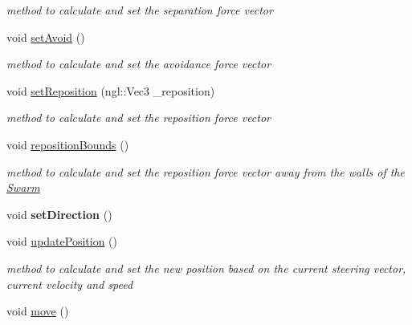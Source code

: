 \begin{DoxyCompactItemize}
\begin{DoxyCompactList}\small\item\em method to calculate and set the separation force vector \end{DoxyCompactList}\item 
\hypertarget{classBoid_add0e553d230a21b35c6e60d8af5f4b9a}{void \hyperlink{classBoid_add0e553d230a21b35c6e60d8af5f4b9a}{set\-Avoid} ()}\label{classBoid_add0e553d230a21b35c6e60d8af5f4b9a}

\begin{DoxyCompactList}\small\item\em method to calculate and set the avoidance force vector \end{DoxyCompactList}\item 
void \hyperlink{classBoid_abaf050c8e4f90b41bacaa4ae850d9722}{set\-Reposition} (ngl\-::\-Vec3 \-\_\-reposition)
\begin{DoxyCompactList}\small\item\em method to calculate and set the reposition force vector \end{DoxyCompactList}\item 
\hypertarget{classBoid_abc245a74a8c5e124ba98d0d07c5ab01e}{void \hyperlink{classBoid_abc245a74a8c5e124ba98d0d07c5ab01e}{reposition\-Bounds} ()}\label{classBoid_abc245a74a8c5e124ba98d0d07c5ab01e}

\begin{DoxyCompactList}\small\item\em method to calculate and set the reposition force vector away from the walls of the \hyperlink{classSwarm}{Swarm} \end{DoxyCompactList}\item 
\hypertarget{classBoid_a141b020067545d3c3af45e26084d257f}{void {\bfseries set\-Direction} ()}\label{classBoid_a141b020067545d3c3af45e26084d257f}

\item 
\hypertarget{classBoid_a9133cb1a761dbbd80a535b4f5576dd00}{void \hyperlink{classBoid_a9133cb1a761dbbd80a535b4f5576dd00}{update\-Position} ()}\label{classBoid_a9133cb1a761dbbd80a535b4f5576dd00}

\begin{DoxyCompactList}\small\item\em method to calculate and set the new position based on the current steering vector, current velocity and speed \end{DoxyCompactList}\item 
\hypertarget{classBoid_ad84ed9152d035b542921547f289024eb}{void \hyperlink{classBoid_ad84ed9152d035b542921547f289024eb}{move} ()}\label{classBoid_ad84ed9152d035b542921547f289024eb}


\end{DoxyCompactItemize}
